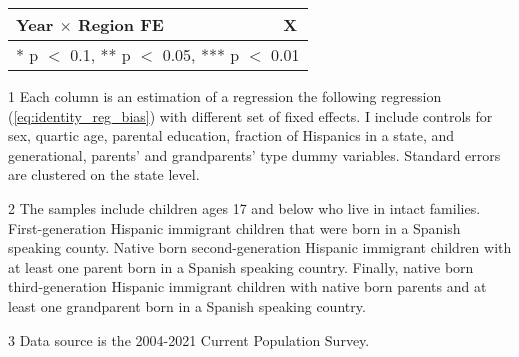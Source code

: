 \begin{table}[H]
{\begin{threeparttable}
\begin{tabular}[t]{lccccc}
Year $\times$ Region FE &  &  &  &  & X\\
\bottomrule
\multicolumn{6}{l}{\rule{0pt}{1em}* p $<$ 0.1, ** p $<$ 0.05, *** p $<$ 0.01}\\
\end{tabular}
\begin{tablenotes}
\small
\item[1] \footnotesize{Each column is an estimation of a regression the following regression 
                      (\ref{eq:identity_reg_bias}) with different set of
                      fixed effects. I include controls for sex, quartic age, parental education, fraction of Hispanics in a state, and generational, parents' and grandparents' type dummy variables.
                      Standard errors are clustered on the state level.}
\item[2] \footnotesize{The samples include children ages 17 and below who live in intact families. 
                      First-generation Hispanic immigrant children that were born in a 
                      Spanish speaking county. Native born second-generation Hispanic 
                      immigrant children with at least one parent born in a Spanish speaking 
                      country. Finally, native born third-generation Hispanic immigrant children 
                      with native born parents and at least one grandparent born in a Spanish 
                      speaking country.}
\item[3] \footnotesize{Data source is the 2004-2021 Current Population Survey.}
\end{tablenotes}
\end{threeparttable}}
\end{table}
